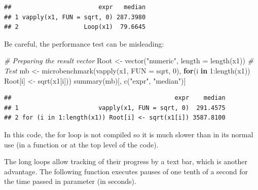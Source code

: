 \documentclass[
  12pt,
  american,
  a4paper,
  extrafontsizes,onecolumn,openright
  ]{memoir}
\newenvironment{Shaded}{\begin{snugshade}}{\end{snugshade}}
\newcommand{\AttributeTok}[1]{\textcolor[rgb]{0.77,0.63,0.00}{#1}}
\newcommand{\CommentTok}[1]{\textcolor[rgb]{0.56,0.35,0.01}{\textit{#1}}}
\newcommand{\ControlFlowTok}[1]{\textcolor[rgb]{0.13,0.29,0.53}{\textbf{#1}}}
\newcommand{\DecValTok}[1]{\textcolor[rgb]{0.00,0.00,0.81}{#1}}
\newcommand{\FunctionTok}[1]{\textcolor[rgb]{0.00,0.00,0.00}{#1}}
\newcommand{\NormalTok}[1]{#1}
\newcommand{\OtherTok}[1]{\textcolor[rgb]{0.56,0.35,0.01}{#1}}
\newcommand{\SpecialCharTok}[1]{\textcolor[rgb]{0.00,0.00,0.00}{#1}}
\newcommand{\StringTok}[1]{\textcolor[rgb]{0.31,0.60,0.02}{#1}}
\newlength{\rf}
\begin{document}
\begin{verbatim}
##                        expr   median
## 1 vapply(x1, FUN = sqrt, 0) 287.3980
## 2                  Loop(x1)  79.6645
\end{verbatim}

\normalsize

Be careful, the performance test can be misleading:

\scriptsize

\begin{Shaded}
\begin{Highlighting}[]
\CommentTok{\# Preparing the result vector}
\NormalTok{Root }\OtherTok{\textless{}{-}} \FunctionTok{vector}\NormalTok{(}\StringTok{"numeric"}\NormalTok{, }\AttributeTok{length =} \FunctionTok{length}\NormalTok{(x1))}
\CommentTok{\# Test}
\NormalTok{mb }\OtherTok{\textless{}{-}} \FunctionTok{microbenchmark}\NormalTok{(}\FunctionTok{vapply}\NormalTok{(x1, }\AttributeTok{FUN =}\NormalTok{ sqrt, }\DecValTok{0}\NormalTok{), }
                     \ControlFlowTok{for}\NormalTok{(i }\ControlFlowTok{in} \DecValTok{1}\SpecialCharTok{:}\FunctionTok{length}\NormalTok{(x1)) }
\NormalTok{                       Root[i] }\OtherTok{\textless{}{-}} \FunctionTok{sqrt}\NormalTok{(x1[i]))}
\FunctionTok{summary}\NormalTok{(mb)[, }\FunctionTok{c}\NormalTok{(}\StringTok{"expr"}\NormalTok{, }\StringTok{"median"}\NormalTok{)]}
\end{Highlighting}
\end{Shaded}

\begin{verbatim}
##                                             expr    median
## 1                      vapply(x1, FUN = sqrt, 0)  291.4575
## 2 for (i in 1:length(x1)) Root[i] <- sqrt(x1[i]) 3587.8100
\end{verbatim}

\normalsize

In this code, the for loop is not compiled so it is much slower than in its normal use (in a function or at the top level of the code).

The long loops allow tracking of their progress by a text bar, which is another advantage.
The following function executes pauses of one tenth of a second for the time passed in parameter (in seconds).

\scriptsize
\end{document}
